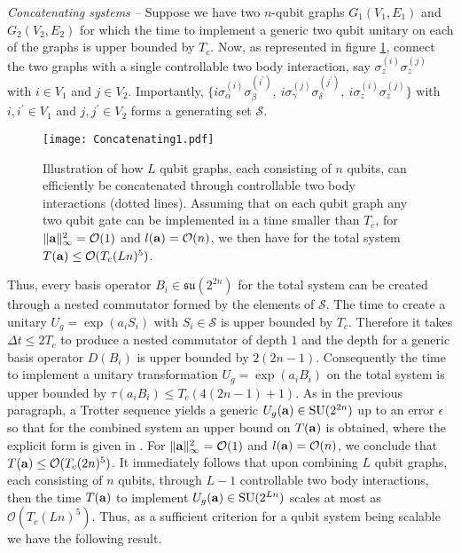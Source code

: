 \documentclass[aps,twocolumn,amsmath,amssymb,nofootinbib,superscriptaddress]{revtex4-1}
\begin{document}
\emph{Concatenating systems --}
Suppose we have two $n$-qubit graphs $G_{1}(V_{1},E_{1})$ and $G_{2}(V_{2},E_{2})$ for which the time to implement a generic two qubit unitary on each of the graphs is upper bounded by $T_{c}$. Now, as represented in figure \ref{fig:concatenation}, connect the two graphs with a single controllable two body interaction, say $\sigma_{z}^{(i)}\sigma_{z}^{(j)}$ with $i\in V_{1}$ and $j\in V_{2}$. Importantly, $\{i\sigma_{\alpha}^{(i)}\sigma_{\beta}^{(i^{\prime})},~i\sigma_{\gamma}^{(j)}\sigma_{\delta}^{(j^{\prime})},~i\sigma_{z}^{(i)}\sigma_{z}^{(j)}\}$ with $i,i^{\prime}\in V_{1}$ and $j,j^{\prime}\in V_{2}$ forms a generating set $\mathcal S$. 
  \begin{figure}[!h]
  \texttt{[image: Concatenating1.pdf]}
 \caption{\label{fig:concatenation} Illustration of how $L$ qubit graphs, each consisting of $n$ qubits, can efficiently be concatenated through controllable two body interactions (dotted lines). Assuming that on each qubit graph any two qubit gate can be implemented in a time smaller than $T_{c}$, for  $\Vert\bold{a}\Vert_{\infty}^{2}=\mathcal O(1)$ and $l(\bold{a})=\mathcal O(n)$, we then have for the total system $T(\bold{a})\leq \mathcal O(T_{c}(Ln)^{5})$.}
\end{figure}

Thus, every basis operator $B_{i}\in\mathfrak{su}(2^{2n})$ for the total system can be created through a nested commutator formed by the elements of $\mathcal S$. The time to create a unitary $U_{g}=\exp(a_{i}S_{i})$ with $S_{i}\in \mathcal S$ is upper bounded by $T_{c}$. Therefore it takes $\Delta t\leq 2T_{c}$ to produce a nested commutator of depth $1$ and the depth for a generic basis operator $D(B_{i})$ is upper bounded by $2(2n-1)$. Consequently the time to implement a unitary transformation $U_{g}=\exp(a_{i}B_{i})$ on the total system is upper bounded by 
$\tau(a_{i}B_{i})\leq T_{c}(4(2n-1)+1)$. 
As in the previous paragraph, a Trotter sequence yields a generic $U_{g}(\bold{a})\in \text{SU}(2^{2n})$ up to an error $\epsilon$ so that for the combined system an upper bound on $T(\bold{a})$ is obtained, where the explicit form is given in \cite{OnlineMaterial}. 
For $\Vert\bold{a}\Vert_{\infty}^{2}=\mathcal O(1)$ and $l(\bold{a})=\mathcal O(n)$, we conclude that $T(\bold{a})\leq \mathcal O(T_{c}(2n)^{5})$. It immediately follows that upon combining $L$ qubit graphs, each consisting of $n$ qubits, through $L-1$ controllable two body interactions, then the time $T(\bold{a})$ to implement $U_{g}(\bold{a})\in \text{SU}(2^{Ln})$ scales at most as $\mathcal O(T_{c}(Ln)^{5})$. Thus, as a sufficient criterion for a qubit system being scalable we have the following result. \\
\end{document}
